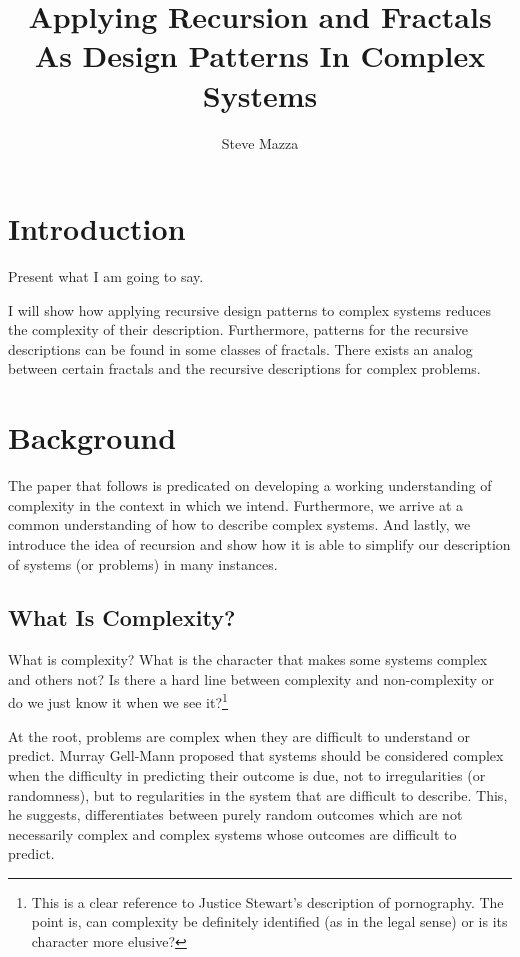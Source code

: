 \documentclass[jou,apacite]{apa6}
\title{Applying Recursion and Fractals As Design Patterns In Complex Systems}
\author{Steve Mazza}
\affiliation{Naval Postgraduate School}
\begin{document}
\maketitle    
                        
\section{Introduction}  %
Present what I am going to say.~\cite[page 112]{Mandelbrot}

I will show how applying recursive design patterns to complex systems reduces the complexity of their description.  Furthermore, patterns for the recursive descriptions can be found in some classes of fractals.  There exists an analog between certain fractals and the recursive descriptions for complex problems.

\section{Background}  %
The paper that follows is predicated on developing a working understanding of complexity in the context in which we intend.  Furthermore, we arrive at a common understanding of how to describe complex systems.  And lastly, we introduce the idea of recursion and show how it is able to simplify our description of systems (or problems) in many instances.

\subsection{What Is Complexity?}  %
What is complexity?  What is the character that makes some systems complex and others not?  Is there a hard line between complexity and non-complexity or do we just know it when we see it?\footnote{This is a clear reference to Justice Stewart's description of pornography.  The point is, can complexity be definitely identified (as in the legal sense) or is its character more elusive?}

At the root, problems are complex when they are difficult to understand or predict.  Murray Gell-Mann proposed that systems should be considered complex when the difficulty in predicting their outcome is due, not to irregularities (or randomness), but to regularities in the system that are difficult to describe.  This, he suggests, differentiates between purely random outcomes which are not necessarily complex and complex systems whose outcomes are difficult to
predict.~\cite{GellMann}
\end{document}
